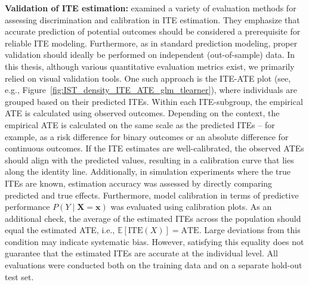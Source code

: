 \textbf{Validation of ITE estimation:} \label{sec:ite_validation} \citet{hoogland2024} examined a variety of evaluation methods for assessing discrimination and calibration in ITE estimation. They emphasize that accurate prediction of potential outcomes should be considered a prerequisite for reliable ITE modeling. Furthermore, as in standard prediction modeling, proper validation should ideally be performed on independent (out-of-sample) data.
In this thesis, although various quantitative evaluation metrics exist, we primarily relied on visual validation tools. One such approach is the ITE-ATE plot (see, e.g., Figure~\ref{fig:IST_density_ITE_ATE_glm_tlearner}), where individuals are grouped based on their predicted ITEs. Within each ITE-subgroup, the empirical ATE is calculated using observed outcomes. Depending on the context, the empirical ATE is calculated on the same scale as the predicted ITEs -- for example, as a risk difference for binary outcomes or an absolute difference for continuous outcomes. If the ITE estimates are well-calibrated, the observed ATEs should align with the predicted values, resulting in a calibration curve that lies along the identity line. Additionally, in simulation experiments where the true ITEs are known, estimation accuracy was assessed by directly comparing predicted and true effects. Furthermore, model calibration in terms of predictive performance $P(Y \mid \mathbf{X} = \mathbf{x})$ was evaluated using calibration plots. As an additional check, the average of the estimated ITEs across the population should equal the estimated ATE, i.e., $\mathbb{E}[\text{ITE}(X)] = \text{ATE}$. Large deviations from this condition may indicate systematic bias. However, satisfying this equality does not guarantee that the estimated ITEs are accurate at the individual level. All evaluations were conducted both on the training data and on a separate hold-out test set.

% 
% 
% 



